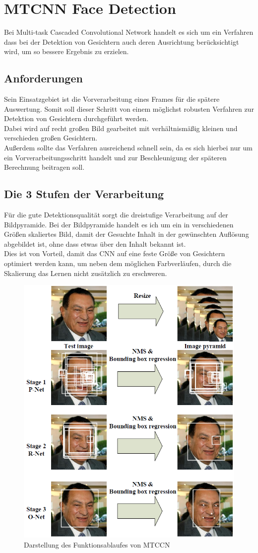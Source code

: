 \section{MTCNN Face Detection}
\label{MTCNN}
Bei Multi-task Cascaded Convolutional Network handelt es sich um ein Verfahren dass bei der Detektion von Gesichtern auch deren Ausrichtung berücksichtigt wird, um so bessere Ergebnis zu erzielen.
\subsection{Anforderungen}
Sein Einsatzgebiet ist die Vorverarbeitung eines Frames für die spätere Auswertung. Somit soll dieser Schritt von einem möglichst robusten Verfahren zur Detektion von Gesichtern durchgeführt werden.\\
Dabei wird auf recht großen Bild gearbeitet mit verhältnismäßig kleinen und verschieden großen Gesichtern.\\
Außerdem sollte das Verfahren ausreichend schnell sein, da es sich hierbei nur um ein Vorverarbeitungsschritt handelt und zur Beschleunigung der späteren Berechnung beitragen soll.
\subsection{Die 3 Stufen der Verarbeitung}
Für die gute Detektionsqualität sorgt die dreistufige Verarbeitung auf der Bildpyramide. Bei der Bildpyramide handelt es ich um ein in verschiedenen Größen skaliertes Bild, damit der Gesuchte Inhalt in der gewünschten Auflösung abgebildet ist, ohne dass etwas über den Inhalt bekannt ist.\\
Dies ist von Vorteil, damit das CNN auf eine feste Größe von Gesichtern optimiert werden kann, um neben dem möglichen Farbverläufen, durch die Skalierung das Lernen nicht zusätzlich zu erschweren.
\begin{figure}
	\centering
	\includegraphics[width=0.5\linewidth]{img/MTCNN_Step}
	\caption{Darstellung des Funktionsablaufes von MTCCN\cite{MTCCN}}
	\label{img_MTCNN_Step}
\end{figure}
